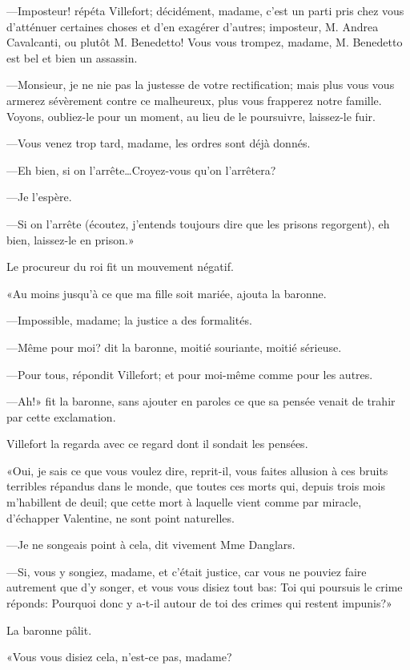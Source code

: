 —Imposteur! répéta Villefort; décidément, madame, c'est un parti pris chez vous d'atténuer certaines choses et d'en exagérer d'autres; imposteur, M. Andrea Cavalcanti, ou plutôt M. Benedetto! Vous vous trompez, madame, M. Benedetto est bel et bien un assassin. 

—Monsieur, je ne nie pas la justesse de votre rectification; mais plus vous vous armerez sévèrement contre ce malheureux, plus vous frapperez notre famille. Voyons, oubliez-le pour un moment, au lieu de le poursuivre, laissez-le fuir. 

—Vous venez trop tard, madame, les ordres sont déjà donnés. 

—Eh bien, si on l'arrête\dots Croyez-vous qu'on l'arrêtera? 

—Je l'espère. 

—Si on l'arrête (écoutez, j'entends toujours dire que les prisons regorgent), eh bien, laissez-le en prison.» 

Le procureur du roi fit un mouvement négatif. 

«Au moins jusqu'à ce que ma fille soit mariée, ajouta la baronne. 

—Impossible, madame; la justice a des formalités. 

—Même pour moi? dit la baronne, moitié souriante, moitié sérieuse. 

—Pour tous, répondit Villefort; et pour moi-même comme pour les autres. 

—Ah!» fit la baronne, sans ajouter en paroles ce que sa pensée venait de trahir par cette exclamation. 

Villefort la regarda avec ce regard dont il sondait les pensées. 

«Oui, je sais ce que vous voulez dire, reprit-il, vous faites allusion à ces bruits terribles répandus dans le monde, que toutes ces morts qui, depuis trois mois m'habillent de deuil; que cette mort à laquelle vient comme par miracle, d'échapper Valentine, ne sont point naturelles. 

—Je ne songeais point à cela, dit vivement Mme Danglars. 

—Si, vous y songiez, madame, et c'était justice, car vous ne pouviez faire autrement que d'y songer, et vous vous disiez tout bas: Toi qui poursuis le crime réponds: Pourquoi donc y a-t-il autour de toi des crimes qui restent impunis?» 

La baronne pâlit. 

«Vous vous disiez cela, n'est-ce pas, madame? 

